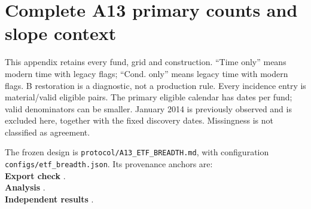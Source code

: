 \clearpage
\section{Complete A13 primary counts and slope context}\label{app:breadth}
This appendix retains every fund, grid and construction. ``Time only'' means modern time with legacy flags; ``Cond. only'' means legacy time with modern flags. B restoration is a diagnostic, not a production rule. Every incidence entry is material/valid eligible pairs. The primary eligible calendar has  dates per fund; valid denominators can be smaller. January 2014 is previously observed and is excluded here, together with the fixed discovery dates. Missingness is not classified as agreement.

The frozen design is \nolinkurl{protocol/A13_ETF_BREADTH.md}, with configuration \nolinkurl{configs/etf_breadth.json}. Its provenance anchors are:\\
\textbf{Export check} .\\
\textbf{Analysis} .\\
\textbf{Independent results} .

\begin{table}[htbp]\centering\small
\caption{Complete A13 RV primary incidence. Materiality is an absolute log ratio above $\log(1.1)$, equivalently a ratio outside $[1/1.1,1.1]$. Modern/reference comparisons have zero material dates but can have missing grids.}

\end{table}

\clearpage
\begin{table}[htbp]\centering\small
\caption{Complete A13 RQ primary incidence. Materiality is an absolute log ratio above $\log(2)$, with reciprocal lower boundary. The larger threshold and fourth-power units differ from RV; these counts do not estimate a latent-noise distribution.}

\end{table}

\clearpage
\begin{table}[htbp]\centering\small
\caption{A13 descriptive H-tilde over lags 1--10 for all fixed constructions/grids. Full -session calendar including previously seen January/discovery dates. Missing values retain calendar endpoints, so comparisons may have different endpoint support; the machine-readable H table also gives common-endpoint contrasts and all lag counts. No latent-H confidence interval is implied.}

\end{table}

